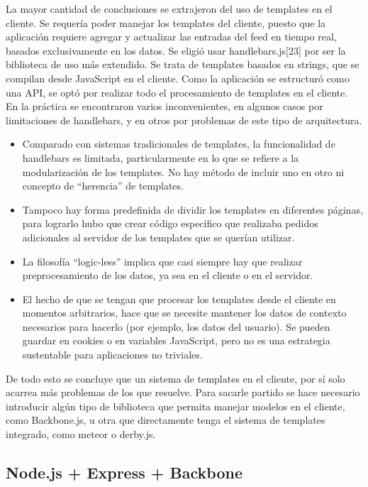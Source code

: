 \documentclass[doc,helv,longtable]{article}
\begin{document}
La mayor cantidad de conclusiones se extrajeron del uso de templates en el cliente. Se requería poder manejar los templates del cliente, puesto que la aplicación requiere agregar y actualizar las entradas del feed en tiempo real, basados exclusivamente en los datos. Se eligió usar handlebars.js[23] por ser la biblioteca de uso más extendido. Se trata de templates basados en strings, que se compilan desde JavaScript en el cliente. Como la aplicación se estructuró como una API, se optó por realizar todo el procesamiento de templates en el cliente. En la práctica se encontraron varios inconvenientes, en algunos casos por limitaciones de handlebars, y en otros por problemas de este tipo de arquitectura.
\begin{itemize}
\item  Comparado con sistemas tradicionales de templates, la funcionalidad de handlebars es limitada, particularmente en lo que se refiere a la modularización de los templates. No hay método de incluir uno en otro ni concepto de “herencia” de templates. 
\item  Tampoco hay forma predefinida de dividir los templates en diferentes páginas, para lograrlo hubo que crear código específico que realizaba pedidos adicionales al servidor de los templates que se querían utilizar.
\item  La filosofía “logic-less” implica que casi siempre hay que realizar preprocesamiento de los datos, ya sea en el cliente o en el servidor.
\item  El hecho de que se tengan que procesar los templates desde el cliente en momentos arbitrarios, hace que se necesite mantener los datos de contexto necesarios para hacerlo (por ejemplo, los datos del usuario). Se pueden guardar en cookies o en variables JavaScript, pero no es una estrategia sustentable para aplicaciones no triviales.

\end{itemize}


De todo esto se concluye que un sistema de templates en el cliente, por sí solo acarrea más problemas de los que resuelve. Para sacarle partido se hace necesario introducir algún tipo de biblioteca que permita manejar modelos en el cliente, como Backbone.js, u otra que directamente tenga el sistema de templates integrado, como meteor o derby.js.\subsection{Node.js + Express + Backbone}
\end{document}
